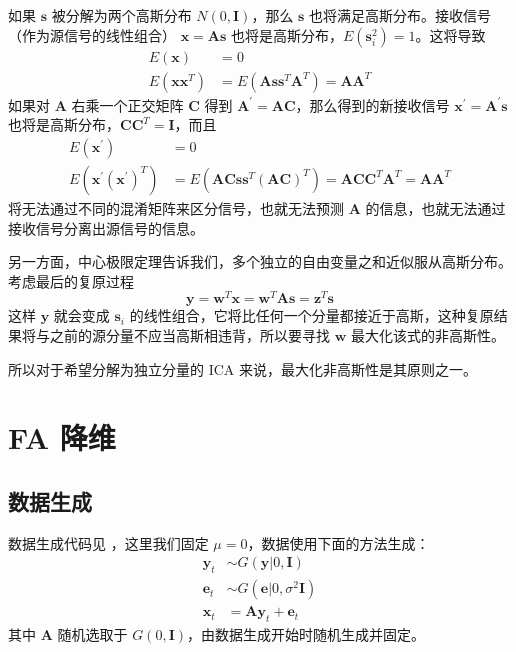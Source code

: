     如果 $\mathbf{s}$ 被分解为两个高斯分布 $N(0,\mathbf{I})$，那么 $\mathbf{s}$ 也将满足高斯分布。接收信号（作为源信号的线性组合） $\mathbf{x}=\mathbf{A}\mathbf{s}$ 也将是高斯分布，$E(\mathbf{s}_i^2)=1$。这将导致
    \begin{align*}
        E(\mathbf{x}) &= 0 \\
        E(\mathbf{x}\mathbf{x}^T) &= E(\mathbf{A}\mathbf{s}\mathbf{s}^T\mathbf{A}^T) = \mathbf{A}\mathbf{A}^T
    \end{align*}
    如果对 $\mathbf{A}$ 右乘一个正交矩阵 $\mathbf{C}$ 得到 $\mathbf{A}^\prime = \mathbf{A}\mathbf{C}$，那么得到的新接收信号 $\mathbf{x}^\prime = \mathbf{A}^\prime \mathbf{s}$ 也将是高斯分布，$\mathbf{CC}^T=\mathbf{I}$，而且
    \begin{align*}
        E(\mathbf{x}^\prime) &= 0 \\
        E(\mathbf{x}^\prime (\mathbf{x}^\prime)^T) &= E(\mathbf{ACs}\mathbf{s}^T(\mathbf{AC})^T) = \mathbf{ACC}^T\mathbf{A}^T = \mathbf{A}\mathbf{A}^T
    \end{align*}
    将无法通过不同的混淆矩阵来区分信号，也就无法预测 $\mathbf{A}$ 的信息，也就无法通过接收信号分离出源信号的信息。
    
    另一方面，中心极限定理告诉我们，多个独立的自由变量之和近似服从高斯分布。考虑最后的复原过程
    \begin{equation*}
        \mathbf{y} = \mathbf{w}^T\mathbf{x} = \mathbf{w}^T\mathbf{A}\mathbf{s} = \mathbf{z}^T\mathbf{s}
    \end{equation*}
    这样 $\mathbf{y}$ 就会变成 $\mathbf{s}_i$ 的线性组合，它将比任何一个分量都接近于高斯，这种复原结果将与之前的源分量不应当高斯相违背，所以要寻找 $\mathbf{w}$ 最大化该式的非高斯性。
    
    所以对于希望分解为独立分量的 ICA 来说，最大化非高斯性是其原则之一。
    
    \section{FA 降维}

    \subsection{数据生成}

    数据生成代码见 ，这里我们固定 $\mu=0$，数据使用下面的方法生成：
    \begin{align*}
        \mathbf{y}_t&\sim G(\mathbf{y}|0,\mathbf{I})\\
        \mathbf{e}_t&\sim G(\mathbf{e}|0,\sigma^2\mathbf{I})\\
        \mathbf{x}_t&=\mathbf{A}\mathbf{y}_t + \mathbf{e}_t
    \end{align*}
    其中 $\mathbf{A}$ 随机选取于 $G(0,\mathbf{I})$，由数据生成开始时随机生成并固定。

